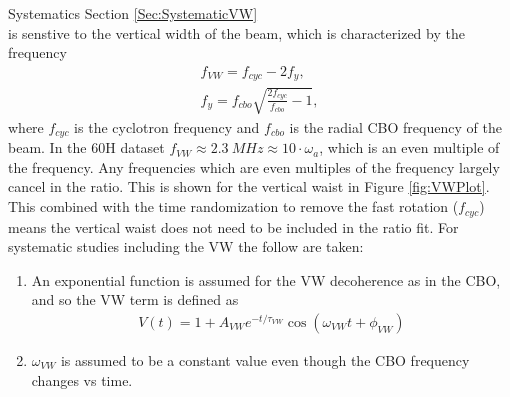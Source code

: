 	\noindent Systematics Section \ref{Sec:SystematicVW} \\

	\wa is senstive to the vertical width of the beam, which is characterized by the frequency 
		\begin{gather}
			f_{VW} = f_{cyc} - 2f_{y}, \\
			f_{y} = f_{cbo} \sqrt{\frac{2f_{cyc}}{f_{cbo}} - 1},
		\end{gather}
	where $f_{cyc}$ is the cyclotron frequency and $f_{cbo}$ is the radial CBO frequency of the beam. In the 60H dataset $f_{VW} \approx \SI{2.3}{MHz} \approx 10 \cdot \omega_{a}$, which is an even multiple of the \gmtwo frequency. Any frequencies which are even multiples of the \gmtwo frequency largely cancel in the ratio. This is shown for the vertical waist in Figure \ref{fig:VWPlot}. This combined with the time randomization to remove the fast rotation ($f_{cyc}$) means the vertical waist does not need to be included in the ratio fit. For systematic studies including the VW the follow are taken:
		\begin{enumerate}
			\item{An exponential function is assumed for the VW decoherence as in the CBO, and so the VW term is defined as
				\begin{gather}
						V(t) = 1 + A_{VW} e^{-t/\tau_{VW}} \cos(\omega_{VW}t + \phi_{VW})
				\end{gather}
			}
			\item{$\omega_{VW}$ is assumed to be a constant value even though the CBO frequency changes vs time.}
		\end{enumerate}

